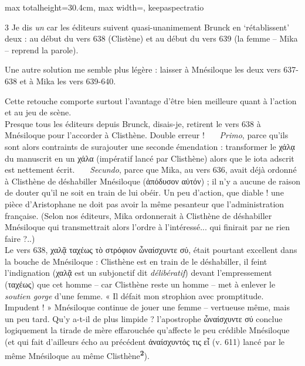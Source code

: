 \documentclass[11pt,twoside]{book}
\newcommand{\italique}[1]{\textit{#1}}
\newcommand{\marqueur}[1]{\textsuperscript{\color{rubricRed}\textbf{#1}}}
\begin{document}
\begin{adjustbox}{max totalheight=30.4cm, max width=\textwidth, keepaspectratio}
\begin{minipage}{\textwidth}
{\begin{multicols}{3}
\noindent Je dis \italique{un} car les éditeurs suivent quasi-unanimement Brunck en `rétablissent' deux : au début du vers 638 (Clistène) et au début du vers 639 (la femme -- Mika -- reprend la parole).
\par\vspace{1.5pt}
\noindent Une autre solution me semble plus légère : laisser à Mnésiloque les deux vers 637-638 et à Mika les vers 639-640.
\par\vspace{1.5pt}
\noindent Cette retouche comporte surtout l'avantage d'être bien meilleure quant à l'action et au jeu de scène.\\ Presque tous les éditeurs depuis Brunck, disais-je, retirent le vers 638 à Mnésiloque pour l'accorder à Clisthène. Double erreur ! \ \ \ \italique{Primo}, parce qu'ils sont alors contraints de surajouter une seconde émendation : transformer le χάλᾳ du manuscrit en un χάλα (impératif lancé par Clisthène) alors que le iota adscrit est nettement écrit. \ \ \ \italique{Secundo}, parce que Mika, au vers 636, avait déjà ordonné à Clisthène de déshabiller Mnésiloque (ἀπόδυσον αὐτόν) ; il n'y a aucune de raison de douter qu'il ne soit en train de lui obéir. Un peu d'action, que diable ! une pièce d'Aristophane ne doit pas avoir la même pesanteur que l'administration française. (Selon nos éditeurs, Mika ordonnerait à Clisthène de déshabiller Mnésiloque qui transmettrait alors l'ordre à l'intéressé... qui finirait par ne rien faire ?..)\\ Le vers 638, χαλᾷ ταχέως τὸ στρόφιον ὦναίσχυντε σύ, était pourtant excellent dans la bouche de Mnésiloque : Clisthène est en train de le déshabiller, il feint l'indignation (χαλᾷ est un subjonctif dit \italique{délibératif}) devant l'empressement (ταχέως) que cet homme -- car Clisthène reste un homme -- met à enlever le \italique{soutien gorge} d'une femme. « Il défait mon strophion avec promptitude. Impudent ! » Mnésiloque continue de jouer une femme -- vertueuse même, mais un peu tard. Qu'y a-t-il de plus limpide ? l'apostrophe ὦναίσχυντε σύ conclue logiquement la tirade de mère effarouchée qu'affecte le peu crédible Mnésiloque (et qui fait d'ailleurs écho au précédent ἀναίσχυντός τις εἶ (v. 611) lancé par le même Mnésiloque au même Clisthène\marqueur{2}).
\par\vspace{1.5pt}

\end{multicols}}
\end{minipage}
\end{adjustbox}
\end{document}
